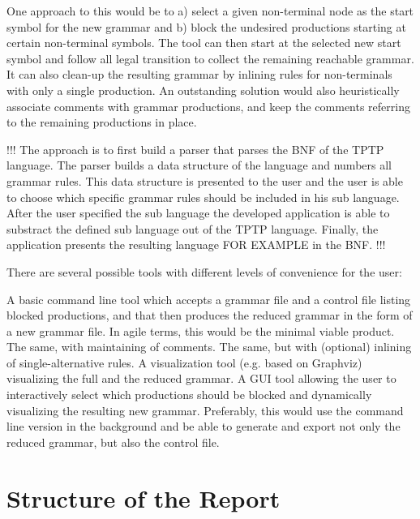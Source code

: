 One approach to this would be to a) select a given non-terminal node as the start symbol for the new grammar and b) block the undesired productions starting at certain non-terminal symbols. The tool can then start at the selected new start symbol and follow all legal transition to collect the remaining reachable grammar. It can also clean-up the resulting grammar by inlining rules for non-terminals with only a single production. An outstanding solution would also heuristically associate comments with grammar productions, and keep the comments referring to the remaining productions in place.

!!!
The approach is to first build a parser that parses the \ac{BNF} of the \ac{TPTP} language. The parser builds a data structure of the language and numbers all grammar rules. This data structure is presented to the user and the user is able to choose which specific grammar rules should be included in his sub language. After the user specified the sub language the developed application is able to substract the defined sub language out of the \ac{TPTP} language. Finally, the application presents the resulting language FOR EXAMPLE in the \ac{BNF}. 
!!!

There are several possible tools with different levels of convenience for the user:

A basic command line tool which accepts a grammar file and a control file listing blocked productions, and that then produces the reduced grammar in the form of a new grammar file. In agile terms, this would be the minimal viable product.
The same, with maintaining of comments.
The same, but with (optional) inlining of single-alternative rules.
A visualization tool (e.g. based on Graphviz) visualizing the full and the reduced grammar.
A GUI tool allowing the user to interactively select which productions should be blocked and dynamically visualizing the resulting new grammar. Preferably, this would use the command line version in the background and be able to generate and export not only the reduced grammar, but also the control file.
\section{Structure of the Report}\label{sec:Structure}
